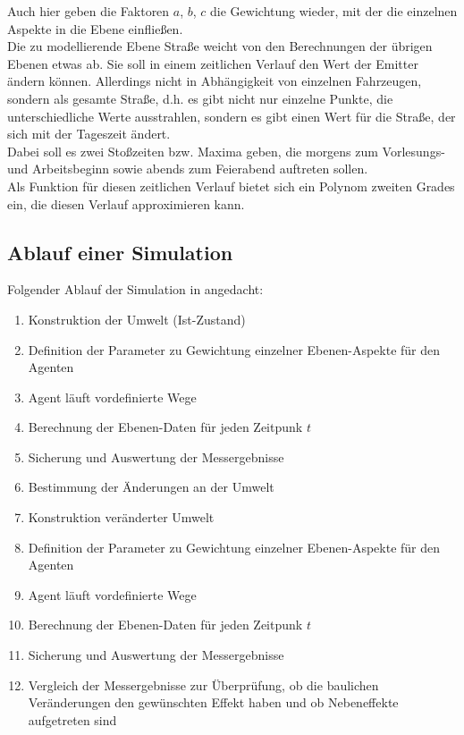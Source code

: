\documentclass[10pt]{scrartcl}
\begin{document}
Auch hier geben die Faktoren $a$, $b$, $c$ die Gewichtung wieder, mit der die einzelnen Aspekte in die Ebene einfließen.\\
Die zu modellierende Ebene Straße weicht von den Berechnungen der übrigen Ebenen etwas ab. Sie soll in einem zeitlichen Verlauf den Wert der Emitter ändern können. Allerdings nicht in Abhängigkeit von einzelnen Fahrzeugen, sondern als gesamte Straße, d.h. es gibt nicht nur einzelne Punkte, die unterschiedliche Werte ausstrahlen, sondern es gibt einen Wert für die Straße, der sich mit der Tageszeit ändert.\\
Dabei soll es zwei Stoßzeiten bzw. Maxima geben, die morgens zum Vorlesungs- und Arbeitsbeginn sowie abends zum Feierabend auftreten sollen.\\
Als Funktion für diesen zeitlichen Verlauf bietet sich ein Polynom zweiten Grades ein, die diesen Verlauf approximieren kann.

\subsection{Ablauf einer Simulation}
Folgender Ablauf der Simulation in angedacht:

\begin{enumerate}
\item Konstruktion der Umwelt (Ist-Zustand)
\item Definition der Parameter zu Gewichtung einzelner Ebenen-Aspekte für den Agenten
\item Agent läuft vordefinierte Wege
\item Berechnung der Ebenen-Daten für jeden Zeitpunk $t$
\item Sicherung und Auswertung der Messergebnisse
\item Bestimmung der Änderungen an der Umwelt
\item Konstruktion veränderter Umwelt
\item Definition der Parameter zu Gewichtung einzelner Ebenen-Aspekte für den Agenten
\item Agent läuft vordefinierte Wege
\item Berechnung der Ebenen-Daten für jeden Zeitpunk $t$
\item Sicherung und Auswertung der Messergebnisse
\item Vergleich der Messergebnisse zur Überprüfung, ob die baulichen Veränderungen den gewünschten Effekt haben und ob Nebeneffekte aufgetreten sind
\end{enumerate}
\end{document}
